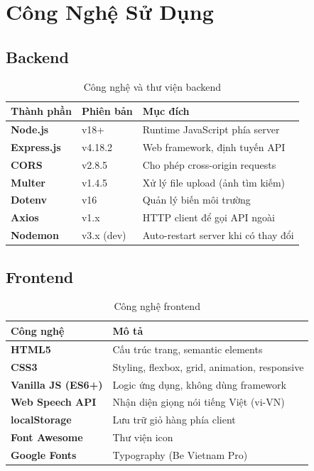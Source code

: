 \documentclass[12pt, a4paper]{report}
\begin{document}
\chapter{Công Nghệ Sử Dụng}

\section{Backend}

\begin{table}[H]
    \centering
    \caption{Công nghệ và thư viện backend}
    \begin{tabular}{>{\bfseries}p{3cm}p{4cm}p{6cm}}
        \toprule
        Thành phần & Phiên bản & Mục đích \\
        \midrule
        Node.js     & v18+         & Runtime JavaScript phía server \\
        Express.js  & v4.18.2      & Web framework, định tuyến API \\
        CORS        & v2.8.5       & Cho phép cross-origin requests \\
        Multer      & v1.4.5       & Xử lý file upload (ảnh tìm kiếm) \\
        Dotenv      & v16          & Quản lý biến môi trường \\
        Axios       & v1.x         & HTTP client để gọi API ngoài \\
        Nodemon     & v3.x (dev)   & Auto-restart server khi có thay đổi \\
        \bottomrule
    \end{tabular}
\end{table}

\section{Frontend}

\begin{table}[H]
    \centering
    \caption{Công nghệ frontend}
    \begin{tabular}{>{\bfseries}p{3.5cm}p{9.5cm}}
        \toprule
        Công nghệ & Mô tả \\
        \midrule
        HTML5            & Cấu trúc trang, semantic elements \\
        CSS3             & Styling, flexbox, grid, animation, responsive \\
        Vanilla JS (ES6+) & Logic ứng dụng, không dùng framework \\
        Web Speech API   & Nhận diện giọng nói tiếng Việt (vi-VN) \\
        localStorage     & Lưu trữ giỏ hàng phía client \\
        Font Awesome     & Thư viện icon \\
        Google Fonts     & Typography (Be Vietnam Pro) \\
        \bottomrule
    \end{tabular}
\end{table}
\end{document}
